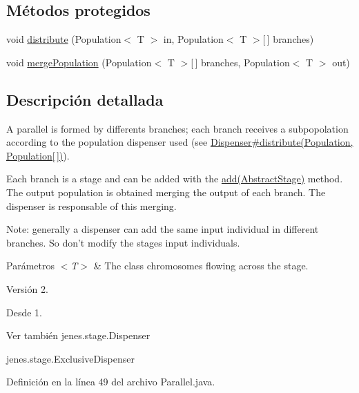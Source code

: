 \subsection*{Métodos protegidos}
\begin{DoxyCompactItemize}
\item 
void \hyperlink{classjenes_1_1stage_1_1_parallel_3_01_t_01extends_01_chromosome_01_4_aafb82610de353045546319738543fab9}{distribute} (Population$<$ T $>$ in, Population$<$ T $>$\mbox{[}$\,$\mbox{]} branches)
\item 
void \hyperlink{classjenes_1_1stage_1_1_parallel_3_01_t_01extends_01_chromosome_01_4_a9cd26799d837f1e1f5ddfcabd0d18aaa}{merge\-Population} (Population$<$ T $>$\mbox{[}$\,$\mbox{]} branches, Population$<$ T $>$ out)
\end{DoxyCompactItemize}


\subsection{Descripción detallada}
A parallel is formed by differents branches; each branch receives a subpopolation according to the population dispenser used (see \hyperlink{}{Dispenser\#distribute(\-Population, Population\mbox{[}$\,$\mbox{]})}).\par
 

Each branch is a stage and can be added with the \hyperlink{}{add(\-Abstract\-Stage)} method. The output population is obtained merging the output of each branch. The dispenser is responsable of this merging. 

Note\-: generally a dispenser can add the same input individual in different branches. So don't modify the stages input individuals. 


\begin{DoxyParams}{Parámetros}
{\em $<$\-T$>$} & The class chromosomes flowing across the stage.\\
\hline
\end{DoxyParams}
\begin{DoxyVersion}{Versión}
2. 
\end{DoxyVersion}
\begin{DoxySince}{Desde}
1.
\end{DoxySince}
\begin{DoxySeeAlso}{Ver también}
jenes.\-stage.\-Dispenser 

jenes.\-stage.\-Exclusive\-Dispenser 
\end{DoxySeeAlso}


Definición en la línea 49 del archivo Parallel.\-java.



